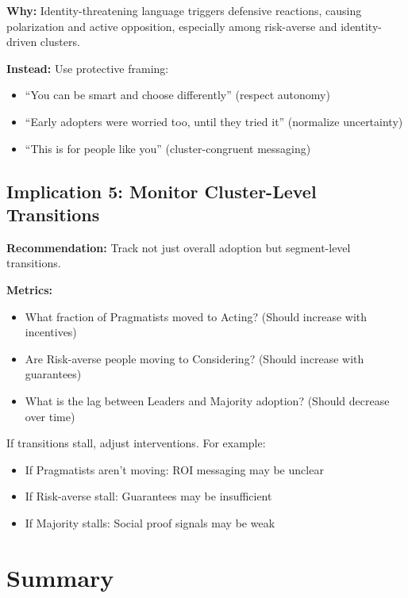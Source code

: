 \textbf{Why:} Identity-threatening language triggers defensive reactions, causing
polarization and active opposition, especially among risk-averse and identity-driven
clusters.

\textbf{Instead:} Use protective framing:
\begin{itemize}[nosep]
    \item ``You can be smart and choose differently'' (respect autonomy)
    \item ``Early adopters were worried too, until they tried it'' (normalize uncertainty)
    \item ``This is for people like you'' (cluster-congruent messaging)
\end{itemize}

\subsection{Implication 5: Monitor Cluster-Level Transitions}

\textbf{Recommendation:} Track not just overall adoption but segment-level transitions.

\textbf{Metrics:}
\begin{itemize}[nosep]
    \item What fraction of Pragmatists moved to Acting? (Should increase with incentives)
    \item Are Risk-averse people moving to Considering? (Should increase with guarantees)
    \item What is the lag between Leaders and Majority adoption? (Should decrease over time)
\end{itemize}

If transitions stall, adjust interventions. For example:
\begin{itemize}[nosep]
    \item If Pragmatists aren't moving: ROI messaging may be unclear
    \item If Risk-averse stall: Guarantees may be insufficient
    \item If Majority stalls: Social proof signals may be weak
\end{itemize}

\section{Summary}

